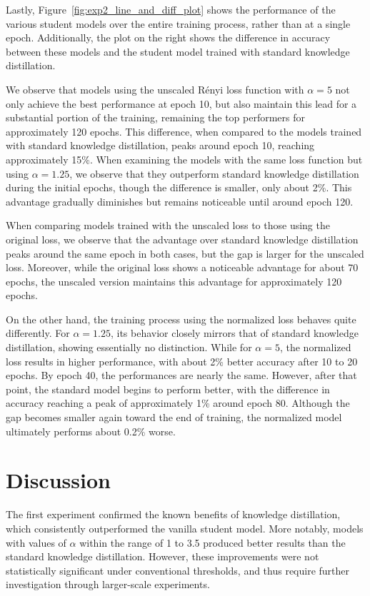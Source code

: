 Lastly, Figure~\ref{fig:exp2_line_and_diff_plot} shows the performance of the various student models over the entire training process, rather than at a single epoch. Additionally, the plot on the right shows the difference in accuracy between these models and the student model trained with standard knowledge distillation.

We observe that models using the unscaled Rényi loss function with $\alpha = 5$ not only achieve the best performance at epoch 10, but also maintain this lead for a substantial portion of the training, remaining the top performers for approximately 120 epochs. This difference, when compared to the models trained with standard knowledge distillation, peaks around epoch 10, reaching approximately 15\%. When examining the models with the same loss function but using $\alpha = 1.25$, we observe that they outperform standard knowledge distillation during the initial epochs, though the difference is smaller, only about 2\%. This advantage gradually diminishes but remains noticeable until around epoch 120.

When comparing models trained with the unscaled loss to those using the original loss, we observe that the advantage over standard knowledge distillation peaks around the same epoch in both cases, but the gap is larger for the unscaled loss. Moreover, while the original loss shows a noticeable advantage for about 70 epochs, the unscaled version maintains this advantage for approximately 120 epochs.

On the other hand, the training process using the normalized loss behaves quite differently. For $\alpha = 1.25$, its behavior closely mirrors that of standard knowledge distillation, showing essentially no distinction. While for $\alpha = 5$, the normalized loss results in higher performance, with about 2\% better accuracy after 10 to 20 epochs. By epoch 40, the performances are nearly the same. However, after that point, the standard model begins to perform better, with the difference in accuracy reaching a peak of approximately 1\% around epoch 80. Although the gap becomes smaller again toward the end of training, the normalized model ultimately performs about 0.2\% worse.

\section{Discussion}

The first experiment confirmed the known benefits of knowledge distillation, which consistently outperformed the vanilla student model. More notably, models with values of $\alpha$ within the range of 1 to 3.5 produced better results than the standard knowledge distillation. However, these improvements were not statistically significant under conventional thresholds, and thus require further investigation through larger-scale experiments.

